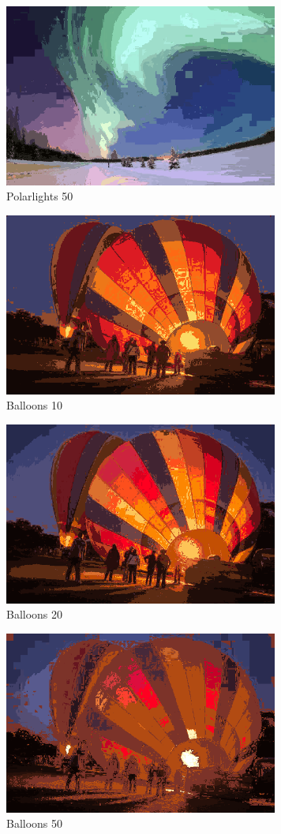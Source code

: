 \documentclass{article}
\begin{document}
\begin{figure}[ht!]
	\centering
	\caption{Polarlights 50}
	\includegraphics[width=90mm]{polarlights-em-k50-56.png}
\end{figure}

\begin{figure}[ht!]
	\centering
	\caption{Balloons 10}
	\includegraphics[width=90mm]{balloons-em-k10-26.png}
\end{figure}

\begin{figure}[ht!]
	\centering
	\caption{Balloons 20}
	\includegraphics[width=90mm]{balloons-em-k20-100.png}
\end{figure}

\begin{figure}[ht!]
	\centering
	\caption{Balloons 50}
	\includegraphics[width=90mm]{balloons-em-k50-100.png}
\end{figure}
\end{document}
